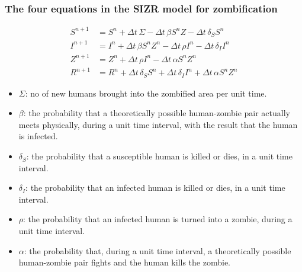 \documentclass{beamer}
\newenvironment{block_mdfboxadmon}[1][]{\begin{block}{#1}}{\end{block}}
\begin{document}
\begin{frame}
\frametitle{The four equations in the SIZR model for zombification}

\begin{align*}
S^{n+1} &= S^n + \Delta t\,\Sigma - \Delta t\,\beta S^nZ - \Delta t\,\delta_S S^n\\
I^{n+1} &= I^n + \Delta t\,\beta S^nZ^n - \Delta t\,\rho I^n - \Delta t\,\delta_I I^n\\
Z^{n+1} &= Z^n + \Delta t\,\rho I^n - \Delta t\,\alpha S^nZ^n\\
R^{n+1} &= R^n + \Delta t\,\delta_S S^n  + \Delta t\,\delta_I I^n +
\Delta t\,\alpha S^nZ^n
\end{align*}


\begin{block_mdfboxadmon}
\vspace{0.5mm}\par\noindent
{\footnotesize 
\begin{itemize}
  \item $\Sigma$: no of new humans brought into the zombified area per unit time.

  \item $\beta$: the probability that a theoretically possible human-zombie pair actually meets physically, during a unit time interval, with the result that the human is infected.

  \item $\delta_S$: the probability that a susceptible human is killed or dies, in a unit time interval.

  \item $\delta_I$: the probability that an infected human is killed or dies, in a unit time interval.

  \item $\rho$: the probability that an infected human is turned into a zombie, during a unit time interval.

  \item $\alpha$: the probability that, during a unit time interval, a theoretically possible human-zombie pair fights and the human kills the zombie.
\end{itemize}

\noindent
\par}
\end{block_mdfboxadmon}
\end{frame}
\end{document}

